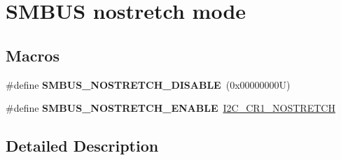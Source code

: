 \hypertarget{group___s_m_b_u_s__nostretch__mode}{}\section{S\+M\+B\+US nostretch mode}
\label{group___s_m_b_u_s__nostretch__mode}
\subsection*{Macros}
\begin{DoxyCompactItemize}
\item 
\mbox{\label{group___s_m_b_u_s__nostretch__mode_ga0e0dcf7850d415b1578c0a0f61d01f8c}} 
\#define {\bfseries S\+M\+B\+U\+S\+\_\+\+N\+O\+S\+T\+R\+E\+T\+C\+H\+\_\+\+D\+I\+S\+A\+B\+LE}~(0x00000000\+U)
\item 
\mbox{\label{group___s_m_b_u_s__nostretch__mode_ga1ebf79e0d6ee7245ab3b0bced65c4dee}} 
\#define {\bfseries S\+M\+B\+U\+S\+\_\+\+N\+O\+S\+T\+R\+E\+T\+C\+H\+\_\+\+E\+N\+A\+B\+LE}~\hyperlink{group___peripheral___registers___bits___definition_ga197aaca79f64e832af3a0a0864c2a08c}{I2\+C\+\_\+\+C\+R1\+\_\+\+N\+O\+S\+T\+R\+E\+T\+CH}
\end{DoxyCompactItemize}


\subsection{Detailed Description}
